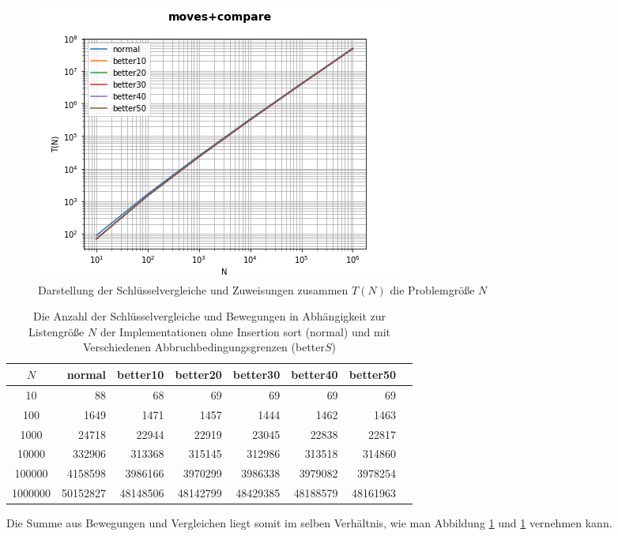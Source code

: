 \documentclass[
   draft=false
  ,paper=a4
  ,twoside=false
  ,fontsize=11pt
  ,headsepline
  ,DIV=11
  ,parskip=full+
  ,titlepage
]{scrartcl} %
\begin{document}
\begin{figure}[htp]
  \centering
  \includegraphics[width=\textwidth]{../moves+compare.png}
  \caption[Bewegungen und Vergleiche]{Darstellung der Schlüsselvergleiche und Zuweisungen zusammen $T(N)$ die Problemgröße $N$}
  \label{fig:total}
\end{figure}


\begin{table}[htp]
  \centering
  \caption[Bewegungen und Vergleiche]{Die Anzahl der Schlüsselvergleiche und Bewegungen in Abhängigkeit 
  zur Listengröße $N$ der Implementationen ohne Insertion sort (normal) und
  mit Verschiedenen Abbruchbedingungsgrenzen (better$S$)}
  \label{tab:total}
  \begin{tabular}{|c|r|r|r|r|r|r|r|}
  \hline
  $N$ & normal & better10 & better20 & better30 & better40 & better50 \\
  \hline
  10 & 88 & 68 & 69 & 69 & 69 & 69 \\
100 & 1649 & 1471 & 1457 & 1444 & 1462 & 1463 \\
1000 & 24718 & 22944 & 22919 & 23045 & 22838 & 22817 \\
10000 & 332906 & 313368 & 315145 & 312986 & 313518 & 314860 \\
100000 & 4158598 & 3986166 & 3970299 & 3986338 & 3979082 & 3978254 \\
1000000 & 50152827 & 48148506 & 48142799 & 48429385 & 48188579 & 48161963 \\
\hline
  \end{tabular}
\end{table}

Die Summe aus Bewegungen und Vergleichen liegt somit im selben Verhältnis, wie man Abbildung \ref{fig:total} und \ref{tab:total} vernehmen kann. 
\end{document}
